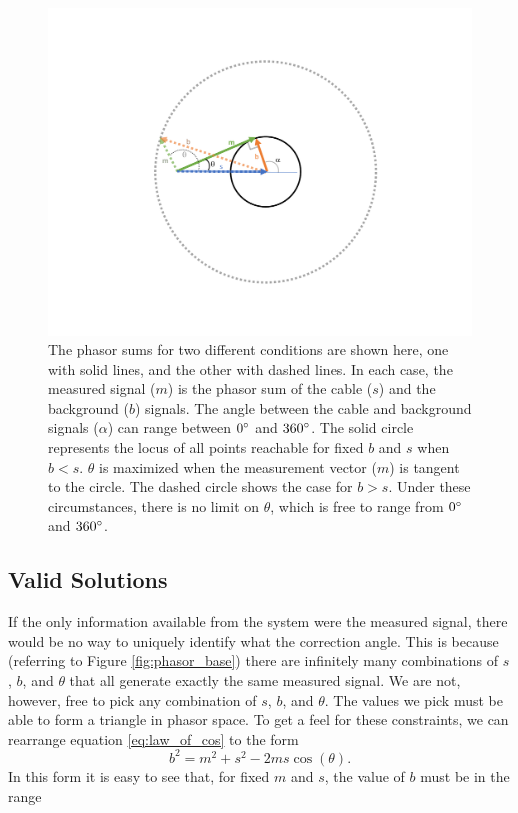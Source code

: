 \documentclass[paper=a4, fontsize=11pt]{scrartcl}
\numberwithin{equation}{section}		%
\numberwithin{figure}{section}			%
\numberwithin{table}{section}				%
\begin{document}
\begin{appendices}
\begin{figure}
  \caption{The phasor sums for two different conditions are shown here, one with solid lines, and the other with dashed lines.  In each case, the measured signal ($m$) is the phasor sum of the cable ($s$) and the background ($b$) signals. The angle between the cable and background signals ($\alpha$) can range between $0\degree$ and $360\degree$.  The solid circle represents the locus of all points reachable for fixed $b$ and $s$ when $b < s$.  $\theta$ is maximized when the measurement vector ($m$) is tangent to the circle.  The dashed circle shows the case for $b > s$.  Under these circumstances, there is no limit on $\theta$, which is free to range from  $0\degree$ and $360\degree$. 
  }
  \label{fig:angle_limits}
  \centering
  \includegraphics[width=1.0\textwidth]{figures/angle_limits.pdf}
\end{figure}




\subsection{Valid Solutions} \label{section:validity}
If the only information available from the system were the measured signal, there would be no way to uniquely identify what the correction angle.  This is because (referring to Figure \ref{fig:phasor_base}) there are infinitely many combinations of $s$, $b$, and $\theta$ that all generate exactly the same measured signal. We are not, however, free to pick any combination of $s$, $b$, and $\theta$.  The values we pick must be able to form a triangle in phasor space.  To get a feel for these constraints, we can rearrange equation \ref{eq:law_of_cos} to the form
\begin{equation}
    b^2 = m^2 + s^2 - 2 m s \cos\left(\theta\right).
\end{equation}
In this form it is easy to see that, for fixed $m$ and $s$, the value of $b$ must be in the range


\end{appendices}
\end{document}
